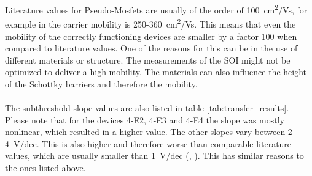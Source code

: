 \documentclass[%
 reprint,
amsmath,amssymb,
pra,
]{revtex4-1}
\begin{document}
Literature values for Pseudo-Mosfets are usually of the order of \SI{100}{cm^2/Vs}, for example in \cite{Loss98} the carrier mobility is 250-\SI{360}{cm^2/Vs}. This means that even the mobility of the correctly functioning devices are smaller by a factor 100 when compared to literature values. One of the reasons for this can be in the use of different materials or structure. The measurements of the SOI might not be optimized to deliver a high mobility. The materials can also influence the height of the Schottky barriers and therefore the mobility.\\
\\
The subthreshold-slope values are also listed in table \ref{tab:transfer_results}. Please note that for the devices 4-E2, 4-E3 and 4-E4 the slope was mostly nonlinear, which resulted in a higher value. The other slopes vary between 2-\SI{4}{V/dec}. This is also higher and therefore worse than comparable literature values, which are usually smaller than \SI{1}{V/dec} (\cite{Loss98}, \cite{mos}). This has similar reasons to the ones listed above.
\newpage
\end{document}

